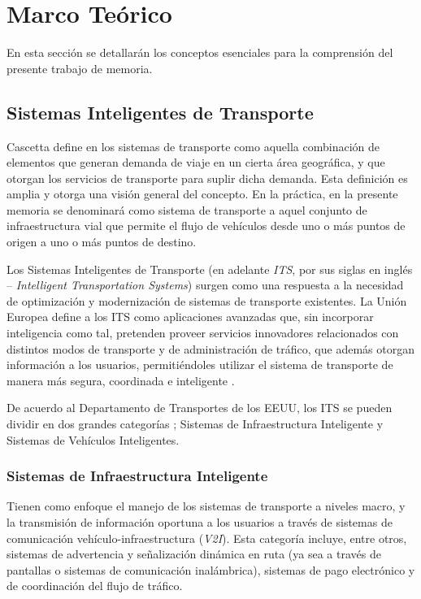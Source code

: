\section{Marco Teórico}

En esta sección se detallarán los conceptos esenciales para la comprensión del presente trabajo de memoria.

\subsection{Sistemas Inteligentes de Transporte}

Cascetta define en \autocite{cascetta2013transportation} los sistemas de transporte como aquella combinación de elementos que generan demanda de viaje en un cierta área geográfica, y que otorgan los servicios de transporte para suplir dicha demanda. Esta definición es amplia y otorga una visión general del concepto. En la práctica, en la presente memoria se denominará como sistema de transporte a aquel conjunto de infraestructura vial que permite el flujo de vehículos desde uno o más puntos de origen a uno o más puntos de destino.

Los Sistemas Inteligentes de Transporte (en adelante \emph{ITS}, por sus siglas en inglés -- \textit{Intelligent Transportation Systems}) surgen como una respuesta a la necesidad de optimización y modernización de sistemas de transporte existentes. La Unión Europea define a los ITS como aplicaciones avanzadas que, sin incorporar inteligencia como tal, pretenden proveer servicios innovadores relacionados con distintos modos de transporte y de administración de tráfico, que además otorgan información a los usuarios, permitiéndoles utilizar el sistema de transporte de manera más segura, coordinada e inteligente \autocite{eudirective}. 

De acuerdo al Departamento de Transportes de los EEUU, los ITS se pueden dividir en dos grandes categorías \autocite{usdot}; Sistemas de Infraestructura Inteligente y Sistemas de Vehículos Inteligentes.

\subsubsection{Sistemas de Infraestructura Inteligente}

Tienen como enfoque el manejo de los sistemas de transporte a niveles macro, y la transmisión de información oportuna a los usuarios a través de sistemas de comunicación vehículo-infraestructura (\emph{V2I}). Esta categoría incluye, entre otros, sistemas de advertencia y señalización dinámica en ruta (ya sea a través de pantallas o sistemas de comunicación inalámbrica), sistemas de pago electrónico y de coordinación del flujo de tráfico.

